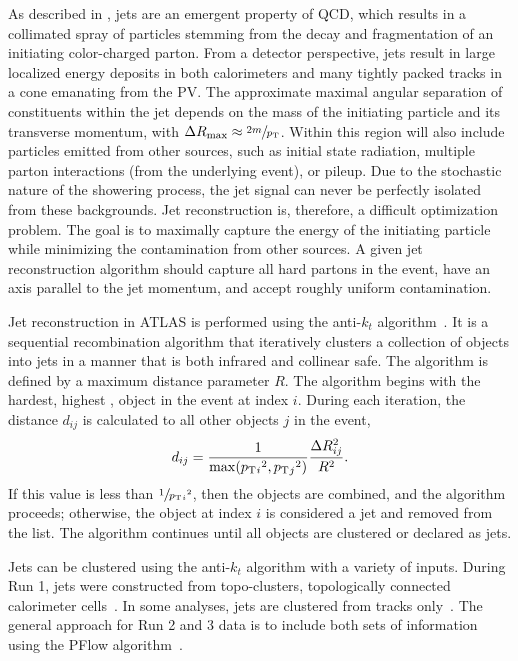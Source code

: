 As described in , jets are an emergent property of QCD\@, which results in a collimated spray of particles stemming from the decay and fragmentation of an initiating color-charged parton.
From a detector perspective, jets result in large localized energy deposits in both calorimeters and many tightly packed tracks in a cone emanating from the \Gls{PV}.
The approximate maximal angular separation of constituents within the jet depends on the mass of the initiating particle and its transverse momentum, with $\Delta R_\text{max} \approx \sfrac{2m}{p_\mathrm{T}}$.
Within this region will also include particles emitted from other sources, such as initial state radiation, multiple parton interactions (from the underlying event), or pileup.
Due to the stochastic nature of the showering process, the jet signal can never be perfectly isolated from these backgrounds.
Jet reconstruction is, therefore, a difficult optimization problem.
The goal is to maximally capture the energy of the initiating particle while minimizing the contamination from other sources.
A given jet reconstruction algorithm should capture all hard partons in the event, have an axis parallel to the jet momentum, and accept roughly uniform contamination.

Jet reconstruction in ATLAS is performed using the anti-$k_t$ algorithm~\cite{AntiKt}.
It is a sequential recombination algorithm that iteratively clusters a collection of objects into jets in a manner that is both infrared and collinear safe.
The algorithm is defined by a maximum distance parameter $R$.
The algorithm begins with the hardest, highest \pt, object in the event at index $i$.
During each iteration, the distance $d_{ij}$ is calculated to all other objects $j$ in the event,
\begin{equation}
    d_{ij} = \frac{1}{\max(p_\mathrm{T}{_i}^2, p_\mathrm{T}{_j}^2)} \frac{\Delta R_{ij}^2}{R^2}.
\end{equation}
If this value is less than $\sfrac{1}{p_\mathrm{T}{_i}^2}$, then the objects are combined, and the algorithm proceeds; otherwise, the object at index $i$ is considered a jet and removed from the list.
The algorithm continues until all objects are clustered or declared as jets.

Jets can be clustered using the anti-$k_t$ algorithm with a variety of inputs.
During Run 1, jets were constructed from topo-clusters, topologically connected calorimeter cells~\cite{TopoJets}.
In some analyses, jets are clustered from tracks only~\cite{TrackJets}.
The general approach for Run 2 and 3 data is to include both sets of information using the \Gls{PFlow} algorithm~\cite{PFlow}.

